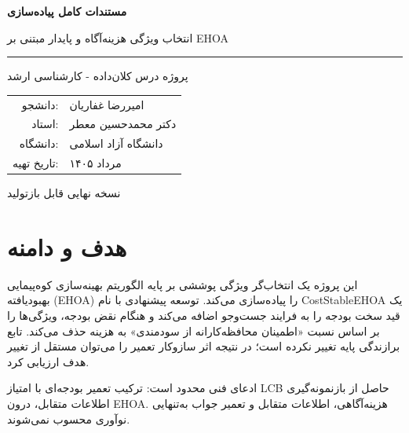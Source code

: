 \documentclass[12pt,a4paper]{article}
\newcommand{\lr}[1]{\foreignlanguage{english}{#1}}
\begin{document}
\begin{titlepage}
\pagecolor{navy}\color{white}
\centering\vspace*{2.3cm}
{\Huge\bfseries مستندات کامل پیاده‌سازی\par}\vspace{.6cm}
{\LARGE انتخاب ویژگی هزینه‌آگاه و پایدار مبتنی بر EHOA\par}\vspace{1.4cm}
\rule{.78\textwidth}{1pt}\vspace{1.4cm}
{\Large پروژه درس کلان‌داده - کارشناسی ارشد\par}\vfill
\begin{tabular}{rl}دانشجو: & امیررضا غفاریان\\ استاد: & دکتر محمدحسین معطر\\ دانشگاه: & دانشگاه آزاد اسلامی\\ تاریخ تهیه: & مرداد ۱۴۰۵\end{tabular}
\vfill\color{white!80}نسخه نهایی قابل بازتولید\end{titlepage}
\nopagecolor\color{black}\tableofcontents\newpage

\section{هدف و دامنه}
این پروژه یک انتخاب‌گر ویژگی پوششی بر پایه الگوریتم بهینه‌سازی کوه‌پیمایی بهبود‌یافته (EHOA) را پیاده‌سازی می‌کند. توسعه پیشنهادی با نام \lr{CostStableEHOA} یک قید سخت بودجه را به فرایند جست‌وجو اضافه می‌کند و هنگام نقض بودجه، ویژگی‌ها را بر اساس نسبت «اطمینان محافظه‌کارانه از سودمندی» به هزینه حذف می‌کند. تابع برازندگی پایه تغییر نکرده است؛ در نتیجه اثر سازوکار تعمیر را می‌توان مستقل از تغییر هدف ارزیابی کرد.

\begin{keybox}
ادعای فنی محدود است: ترکیب تعمیر بودجه‌ای با امتیاز \lr{LCB} حاصل از بازنمونه‌گیری اطلاعات متقابل، درون EHOA. هزینه‌آگاهی، اطلاعات متقابل و تعمیر جواب به‌تنهایی نوآوری محسوب نمی‌شوند.
\end{keybox}
\end{document}

